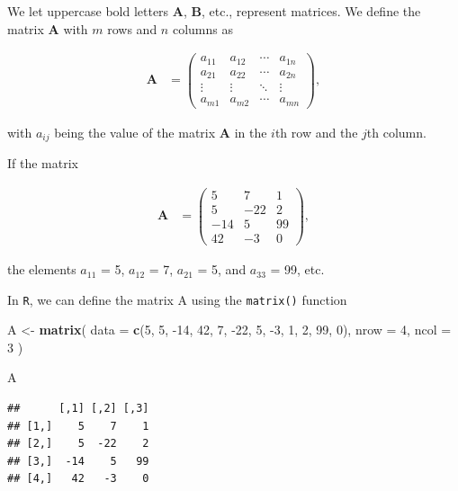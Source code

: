 \documentclass[
]{book}
\newenvironment{Shaded}{\begin{snugshade}}{\end{snugshade}}
\newcommand{\DataTypeTok}[1]{\textcolor[rgb]{0.13,0.29,0.53}{#1}}
\newcommand{\DecValTok}[1]{\textcolor[rgb]{0.00,0.00,0.81}{#1}}
\newcommand{\KeywordTok}[1]{\textcolor[rgb]{0.13,0.29,0.53}{\textbf{#1}}}
\newcommand{\NormalTok}[1]{#1}
\newcommand{\StringTok}[1]{\textcolor[rgb]{0.31,0.60,0.02}{#1}}
\theoremstyle{definition}
\theoremstyle{definition}
\theoremstyle{definition}
\theoremstyle{remark}
\begin{document}
We let uppercase bold letters \(\mathbf{A}\), \(\mathbf{B}\), etc., represent matrices. We define the matrix \(\mathbf{A}\) with \(m\) rows and \(n\) columns as

\[
\begin{aligned}
\mathbf{A} & = \begin{pmatrix} a_{11} & a_{12} & \cdots & a_{1n} \\
a_{21} & a_{22} & \cdots & a_{2n} \\
\vdots & \vdots & \ddots & \vdots \\
a_{m1} & a_{m2} & \cdots & a_{mn}
\end{pmatrix},
\end{aligned}
\]

with \(a_{ij}\) being the value of the matrix \(\mathbf{A}\) in the \(i\)th row and the \(j\)th column.

If the matrix

\[
\begin{aligned}
\mathbf{A} & = \begin{pmatrix} 5 & 7 & 1 \\
5 & -22  & 2 \\
-14 & 5 & 99 \\
42 & -3 & 0\end{pmatrix},
\end{aligned}
\]

the elements \(a_{11}\) = 5, \(a_{12}\) = 7, \(a_{21}\) = 5, and \(a_{33}\) = 99, etc.

In \texttt{R}, we can define the matrix A using the \texttt{matrix()} function

\begin{Shaded}
\begin{Highlighting}[]
\NormalTok{A <-}\StringTok{ }\KeywordTok{matrix}\NormalTok{(}
    \DataTypeTok{data =} \KeywordTok{c}\NormalTok{(}\DecValTok{5}\NormalTok{, }\DecValTok{5}\NormalTok{, }\DecValTok{-14}\NormalTok{, }\DecValTok{42}\NormalTok{, }\DecValTok{7}\NormalTok{, }\DecValTok{-22}\NormalTok{, }\DecValTok{5}\NormalTok{, }\DecValTok{-3}\NormalTok{, }\DecValTok{1}\NormalTok{, }\DecValTok{2}\NormalTok{, }\DecValTok{99}\NormalTok{, }\DecValTok{0}\NormalTok{),}
    \DataTypeTok{nrow =} \DecValTok{4}\NormalTok{,}
    \DataTypeTok{ncol =} \DecValTok{3}
\NormalTok{)}

\NormalTok{A}
\end{Highlighting}
\end{Shaded}

\begin{verbatim}
##      [,1] [,2] [,3]
## [1,]    5    7    1
## [2,]    5  -22    2
## [3,]  -14    5   99
## [4,]   42   -3    0
\end{verbatim}
\end{document}

